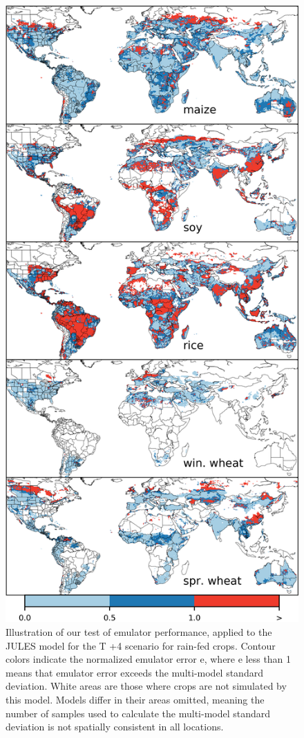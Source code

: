 \documentclass[10pt]{article}
\begin{document}
\begin{figure}[h!]
\begin{minipage}{.45\textwidth}
    \caption{Illustration  of  our  test  of  emulator  performance,  applied  to  the JULES model for the T +4 scenario for rain-fed crops.  Contour colors indicate the normalized emulator error e, where e less than 1 means that emulator error exceeds the multi-model standard deviation. White areas are those where crops are not simulated by this model. Models differ in their areas omitted, meaning the number of samples used to calculate the multi-model standard deviation is not spatially consistent in all locations.}
    \label{fig:errorjules}
\end{minipage}
\hspace{.05\linewidth}
\begin{minipage}{.45\textwidth}
    \centering
    \includegraphics[width=\textwidth]{s_em_err_PROMET.png}

\end{minipage}
\end{figure}
\end{document}
